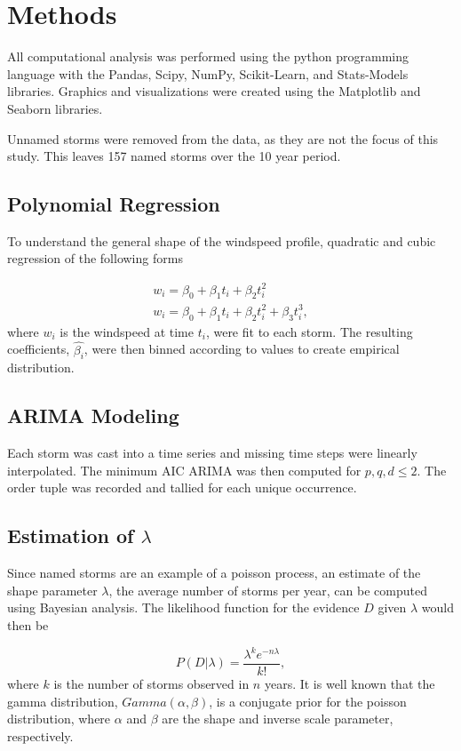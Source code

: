 \documentclass{article}
\begin{document}
	\section{Methods}
	 All computational analysis was performed using the python programming language with the Pandas, Scipy, NumPy, Scikit-Learn, and Stats-Models libraries\cite{mckinney2010data, scipy, walt2011numpy, scikit-learn, statsmodels2010}. Graphics and visualizations were created using the Matplotlib and Seaborn libraries\cite{hunter2007matplotlib, michael_waskom_2014_12710}.
	 
	 Unnamed storms were removed from the data, as they are not the focus of this study. This leaves 157 named storms over the 10 year period. 

	\subsection{Polynomial Regression}
	To understand the general shape of the windspeed profile, quadratic and cubic regression of the following forms
	
		\begin{align}
			w_i = \beta_0 + \beta_1 t_i + \beta_2 t_i^2\\
			w_i = \beta_0 + \beta_1 t_i + \beta_2 t_i^2 + \beta_3 t_i^3,
		\end{align}
	where $w_i$ is the windspeed at time $t_i$, were fit to each storm. The resulting coefficients, $\hat{\beta_i}$, were then binned 
according to values to create empirical distribution.

	\subsection{ARIMA Modeling}
	Each storm was cast into a time series and missing time steps were linearly interpolated. The minimum AIC ARIMA was then computed for $p, q, d \le 2$. The order tuple was recorded and tallied for each unique occurrence.

	\subsection{Estimation of $\lambda$}
	Since named storms are an example of a poisson process, an estimate of the shape parameter $\lambda$, the average number of storms per year, can be computed using Bayesian analysis. The likelihood function for the evidence $D$ given $\lambda$ would then be
	
		\begin{equation}
			P(D | \lambda) = \frac{\lambda^k e^{-n \lambda}}{k!},
		\end{equation}
		where $k$ is the number of storms observed in $n$ years. It is well known that the gamma distribution, $Gamma(\alpha, \beta)$, is a conjugate prior for the poisson distribution, where $\alpha$ and $\beta$ are the shape and inverse scale parameter, respectively. 

	
	
\end{document}
